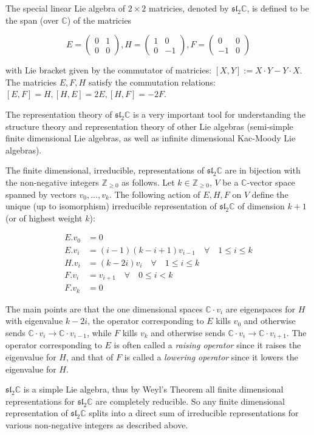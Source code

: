 \documentclass[12pt]{article}
\begin{document}
The special linear Lie algebra of $2 \times 2$ matricies, denoted by $\mathfrak{sl}_2 \mathbb{C}$, is defined to be the span (over $\mathbb{C}$) of the matricies

\[ E = \left( \begin{array}{cc} 0 & 1 \\ 0 & 0 \end{array} \right),
H = \left( \begin{array}{cc} 1 & 0 \\ 0 & -1 \end{array} \right),
F = \left( \begin{array}{cc} 0 & 0 \\ -1 & 0 \end{array} \right) \]

with Lie bracket given by the commutator of matricies: $[X,Y] := X \cdot Y - Y \cdot X$. The matricies $E, F, H$ satisfy the commutation relations: $[E, F] = H, [H, E] = 2 E, [H, F] = -2 F$.

The representation theory of $\mathfrak{sl}_2 \mathbb{C}$ is a very important tool for understanding the structure theory and representation theory of other Lie algebras (semi-simple finite dimensional Lie algebras, as well as infinite dimensional Kac-Moody Lie algebras).

The finite dimensional, irreducible, representations of $\mathfrak{sl}_2 \mathbb{C}$ are in bijection with the non-negative integers $\mathbb{Z}_{\ge 0}$ as follows. Let $k \in \mathbb{Z}_{\ge 0}$, $V$ be a $\mathbb{C}$-vector space spanned by vectors $v_0, \ldots, v_k$. The following action of $E, H, F$ on $V$ define the unique (up to isomorphism) irreducible representation of $\mathfrak{sl}_2 \mathbb{C}$ of dimension $k+1$ (or of highest weight $k$):

\[ 
\begin{array}{ll} 
E . v_0 & = 0 \\
E . v_i & = (i-1)(k-i+1) v_{i-1} \quad \forall \quad 1 \le i \le k \\
H . v_i & = (k - 2i) v_i         \quad \forall \quad 1 \le i \le k \\ 
F . v_i & = v_{i+1}              \quad \forall \quad 0 \le i < k \\
F . v_k & = 0
\end{array}
\]

The main points are that the one dimensional spaces $\mathbb{C} \cdot v_i$ are eigenspaces for $H$ with eigenvalue $k - 2i$, the operator corresponding to $E$ kills $v_0$ and otherwise sends $\mathbb{C} \cdot v_i \to \mathbb{C} \cdot v_{i-1}$, while $F$ kills $v_k$ and otherwise sends $\mathbb{C} \cdot v_i \to \mathbb{C} \cdot v_{i+1}$. The operator corresponding to $E$ is often called a \emph{raising operator} since it raises the eigenvalue for $H$, and that of $F$ is called a \emph{lowering operator} since it lowers the eigenvalue for $H$.

$\mathfrak{sl}_2 \mathbb{C}$ is a simple Lie algebra, thus by Weyl's Theorem all finite dimensional representations for $\mathfrak{sl}_2 \mathbb{C}$ are completely reducible. So any finite dimensional representation of $\mathfrak{sl}_2 \mathbb{C}$ splits into a direct sum of irreducible representations for various non-negative integers as described above.
\end{document}
